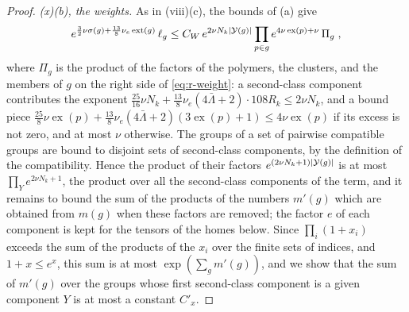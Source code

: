 \documentclass[11pt]{preprint}
\DeclarePairedDelimiter{\abs}{\lvert}{\rvert}
\numberwithin{equation}{section}
\theoremstyle{definition}
\theoremstyle{remark}
\theoremstyle{plain}
\begin{document}
\begin{proof}
\emph{(x)(b), the weights.} As in (viii)(c), the bounds of (a) give
\[
    e^{\frac32\nu\sigma(g) + \frac{13}{8}\nu_e\operatorname{ext}(g)}\,\ell_g \leq C_W\,e^{2\nu N_k\abs{\mathcal Y(g)}}\prod_{p \in g}e^{4\nu\operatorname{ex}(p) + \nu}\,\Pi_g\;,
\]
where $\Pi_g$ is the product of the factors of the polymers, the clusters, and the members of $g$ on the right side of \eqref{eq:r-weight}: a second-class component contributes the exponent $\frac{25}{16}\nu N_k + \frac{13}{8}\nu_e(4\bar\Lambda + 2) \cdot 108R_k \leq 2\nu N_k$, and a bound piece $\frac{25}{8}\nu\operatorname{ex}(p) + \frac{13}{8}\nu_e(4\bar\Lambda + 2)(3\operatorname{ex}(p) + 1) \leq 4\nu\operatorname{ex}(p)$ if its excess is not zero, and at most $\nu$ otherwise. The groups of a set of pairwise compatible groups are bound to disjoint sets of second-class components, by the definition of the compatibility. Hence the product of their factors $e^{(2\nu N_k + 1)\abs{\mathcal Y(g)}}$ is at most $\prod_Ye^{2\nu N_k + 1}$, the product over all the second-class components of the term, and it remains to bound the sum of the products of the numbers $m'(g)$ which are obtained from $m(g)$ when these factors are removed; the factor $e$ of each component is kept for the tensors of the homes below. Since $\prod_i(1 + x_i)$ exceeds the sum of the products of the $x_i$ over the finite sets of indices, and $1 + x \leq e^x$, this sum is at most $\exp(\sum_gm'(g))$, and we show that the sum of $m'(g)$ over the groups whose first second-class component is a given component $Y$ is at most a constant $C'_x$.


\end{proof}
\end{document}
